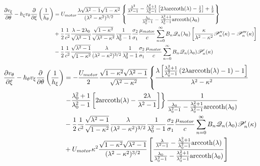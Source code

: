 \documentclass[fontsize=11pt, %
                             paper=a4, %
                             twoside, %
                             captions=tableheading,
                             index=totoc,
                             hyperref]{labbook}
\begin{document}
\begin{addmargin}[4cm]{0cm}
\begin{equation}
\begin{aligned}
\end{aligned}
\end{equation}
\begin{equation}
\begin{aligned}
\frac{\partial v_\xi}{\partial \theta}-h_\xi v_\theta\frac{\partial }{\partial \xi}\left(\frac{1}{h_\theta}\right)&=U_{motor}\frac{\lambda\sqrt{\lambda^2-1}\sqrt{1-\kappa^2}}{(\lambda^2-\kappa^2)^{3/2}}\left\{ \frac{\frac{\lambda^2}{\lambda^2-1}-\frac{\lambda_0^2+1}{\lambda_0^2-1}\left[2\lambda\mathrm{arccoth}(\lambda)-\frac{1}{2}\right]+\frac{1}{2}}{\frac{\lambda_0}{\lambda_0^2-1}-\frac{\lambda_0^2+1}{\lambda_0^2-1}\mathrm{arccoth}(\lambda_0)} \right\}\\
&+\frac{1}{2}\frac{1}{c^2}\frac{\lambda-2\lambda_0}{\sqrt{\lambda^2-1}}\frac{\sqrt{1-\kappa^2}}{\sqrt{\lambda^2-\kappa^2}}\frac{1}{\lambda_0^2-1}\frac{\sigma_2}{\sigma_1}\frac{\mu_{motor}}{c}\sum_{n=0}^\infty B_n \mathscr{Q}_n(\lambda_0)\left[\frac{\kappa}{\lambda^2-\kappa^2}\mathscr{P}_n^{\prime\prime}(\kappa)-\mathscr{P}_n^{\prime\prime\prime}(\kappa)\right]\\
&-\frac{1}{2}\frac{1}{c^2}\frac{\sqrt{\lambda^2-1}}{\sqrt{1-\kappa^2}}\frac{\lambda}{(\lambda^2-\kappa^2)^{3/2}}\frac{1}{\lambda_0^2-1}\frac{\sigma_2}{\sigma_1}\frac{\mu_{motor}}{c}\sum_{n=0}^\infty B_n\mathscr{Q}_n(\lambda_0)\mathscr{P}_n^\prime(\kappa)
\end{aligned}
\end{equation}
\begin{equation}
\begin{aligned}
\pd{v_\theta}{\xi}-h_\theta v_\xi \pd{}{\theta}\left(\frac{1}{h_\xi}\right)&=-\frac{U_{motor}}{2}\frac{\sqrt{1-\kappa^2}\sqrt{\lambda^2-1}}{\sqrt{\lambda^2-\kappa^2}}\left\{\frac{\lambda\left[\frac{\lambda_0^2+1}{\lambda_0^2-1}\left(2\lambda\mathrm{arccoth}(\lambda)-1\right)-1\right]}{\lambda^2-\kappa^2}\right.\\
&\left. -\frac{\lambda_0^2+1}{\lambda_0^2-1}\left[2\mathrm{arccoth}(\lambda)-\frac{2\lambda}{\lambda^2-1}\right]\right\}
\frac{1}{\frac{\lambda_0}{\lambda_0^2-1}-\frac{\lambda_0^2+1}{\lambda_0^2-1}\mathrm{arccoth}(\lambda_0)}\\
&-\frac{1}{2}\frac{1}{c^2}\frac{\sqrt{\lambda^2-1}}{\sqrt{1-\kappa^2}}\frac{\lambda}{(\lambda^2-\kappa^2)^{3/2}}\frac{1}{\lambda_0^2-1}\frac{\sigma_2}{\sigma_1}\frac{\mu_{motor}}{c}\sum_{n=0}^\infty B_n \mathscr{Q}_n(\lambda_0)\mathscr{P}_n^\prime(\kappa)\\
&+U_{motor}\kappa^2\frac{\sqrt{1-\kappa^2}\sqrt{\lambda^2-1}}{(\lambda^2-\kappa^2)^{3/2}}\left[\frac{\frac{\lambda}{\lambda^2-1}-\frac{\lambda_0^2+1}{\lambda_0^2-1}\mathrm{arccoth}(\lambda)}{\frac{\lambda_0}{\lambda_0^2-1}-\frac{\lambda_0^2+1}{\lambda_0^2-1}\mathrm{arccoth}(\lambda_0)}\right]\\

\end{aligned}
\end{equation}
\end{addmargin}
\end{document}
